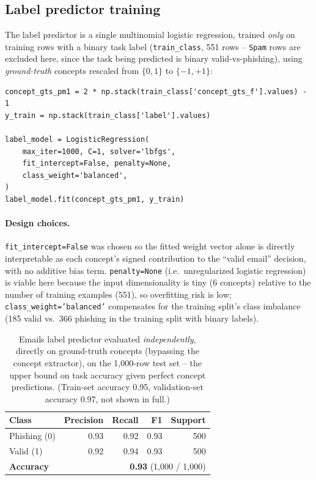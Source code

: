 \documentclass[11pt]{article}
\newcommand{\code}[1]{\texttt{#1}}
\begin{document}
\subsection{Label predictor training}

The label predictor is a single multinomial logistic regression, trained
\emph{only} on training rows with a binary task label (\code{train\_class},
551 rows -- \code{Spam} rows are excluded here, since the task being
predicted is binary valid-vs-phishing), using \emph{ground-truth} concepts
rescaled from $\{0,1\}$ to $\{-1,+1\}$:

\begin{lstlisting}
concept_gts_pm1 = 2 * np.stack(train_class['concept_gts_f'].values) - 1
y_train = np.stack(train_class['label'].values)

label_model = LogisticRegression(
    max_iter=1000, C=1, solver='lbfgs',
    fit_intercept=False, penalty=None,
    class_weight='balanced',
)
label_model.fit(concept_gts_pm1, y_train)
\end{lstlisting}

\paragraph{Design choices.} \code{fit\_intercept=False} was chosen so the
fitted weight vector alone is directly interpretable as each concept's
signed contribution to the ``valid email'' decision, with no additive bias
term. \code{penalty=None} (i.e.\ unregularized logistic regression) is
viable here because the input dimensionality is tiny (6 concepts) relative
to the number of training examples (551), so overfitting risk is low;
\code{class\_weight='balanced'} compensates for the training split's class
imbalance (185 valid vs.\ 366 phishing in the training split with binary
labels).

\begin{table}[h]
\centering
\begin{tabular}{lrrrr}
\toprule
Class & Precision & Recall & F1 & Support \\
\midrule
Phishing (0) & 0.93 & 0.92 & 0.93 & 500 \\
Valid (1)    & 0.92 & 0.94 & 0.93 & 500 \\
\midrule
\textbf{Accuracy} & \multicolumn{4}{r}{\textbf{0.93} (1{,}000 / 1{,}000)} \\
\bottomrule
\end{tabular}
\caption{Emails label predictor evaluated \emph{independently}, directly on
ground-truth concepts (bypassing the concept extractor), on the 1{,}000-row
test set -- the upper bound on task accuracy given perfect concept
predictions. (Train-set accuracy 0.95, validation-set accuracy 0.97, not
shown in full.)}
\end{table}
\end{document}
